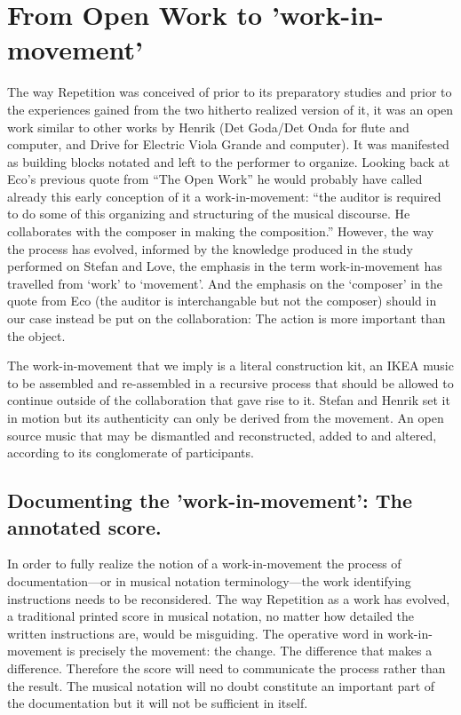 \section{From Open Work to 'work-in-movement' }
\label{sec:from-open-work-1}

The way Repetition was conceived of prior to its preparatory studies
and prior to the experiences gained from the two hitherto realized
version of it, it was an open work similar to other works by Henrik
(Det Goda/Det Onda for flute and computer, and Drive for Electric
Viola Grande and computer). It was manifested as building blocks
notated and left to the performer to organize. Looking back at Eco's
previous quote from ``The Open Work'' he would probably have called
already this early conception of it a work-in-movement: ``the auditor
is required to do some of this organizing and structuring of the
musical discourse. He collaborates with the composer in making the
composition.'' However, the way the process has evolved, informed by
the knowledge produced in the study performed on Stefan and Love, the
emphasis in the term work-in-movement has travelled from `work' to
`movement'. And the emphasis on the `composer' in the quote from Eco
(the auditor is interchangable but not the composer) should in our
case instead be put on the collaboration: The action is more important
than the object.

The work-in-movement that we imply is a literal construction kit, an
IKEA music to be assembled and re-assembled in a recursive process
that should be allowed to continue outside of the collaboration that
gave rise to it. Stefan and Henrik set it in motion but its
authenticity can only be derived from the movement. An open source
music that may be dismantled and reconstructed, added to and altered,
according to its conglomerate of participants.

\subsection{Documenting the 'work-in-movement': The annotated score. }
\label{sec:docum-work-movem-1}

In order to fully realize the notion of a work-in-movement the process
of documentation---or in musical notation terminology---the work
identifying instructions needs to be reconsidered. The way Repetition
as a work has evolved, a traditional printed score in musical
notation, no matter how detailed the written instructions are, would
be misguiding. The operative word in work-in-movement is precisely the
movement: the change. The difference that makes a
difference. Therefore the score will need to communicate the process
rather than the result. The musical notation will no doubt constitute
an important part of the documentation but it will not be sufficient
in itself.

